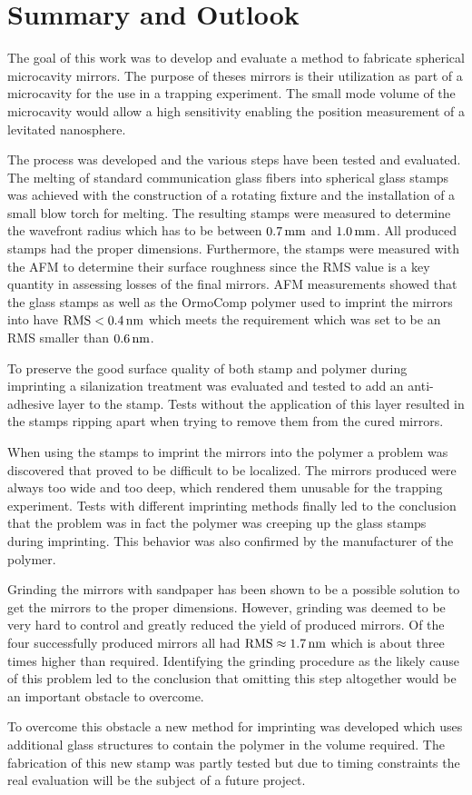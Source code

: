 \chapter{Summary and Outlook}
The goal of this work was to develop and evaluate a method to fabricate spherical microcavity mirrors. The purpose of theses mirrors is their utilization as part of a microcavity for the use in a trapping experiment. The small mode volume of the microcavity would allow a high sensitivity enabling the position measurement of a levitated nanosphere.

The process was developed and the various steps have been tested and evaluated. The melting of standard communication glass fibers into spherical glass stamps was achieved with the construction of a rotating fixture and the installation of a small blow torch for melting. The resulting stamps were measured to determine the wavefront radius which has to be between $0.7\mm$ and $1.0\mm$. All produced stamps had the proper dimensions. Furthermore, the stamps were measured with the AFM to determine their surface roughness since the RMS value is a key quantity in assessing losses of the final mirrors. AFM measurements showed that the glass stamps as well as the OrmoComp polymer used to imprint the mirrors into have $\si{RMS}<0.4\nm$ which meets the requirement which was set to be an RMS smaller than $0.6\nm$.

To preserve the good surface quality of both stamp and polymer during imprinting a silanization treatment was evaluated and tested to add an anti-adhesive layer to the stamp. Tests without the application of this layer resulted in the stamps ripping apart when trying to remove them from the cured mirrors.

When using the stamps to imprint the mirrors into the polymer a problem was discovered that proved to be difficult to be localized. The mirrors produced were always too wide and too deep, which rendered them unusable for the trapping experiment. Tests with different imprinting methods finally led to the conclusion that the problem was in fact the polymer was creeping up the glass stamps during imprinting. This behavior was also confirmed by the manufacturer of the polymer. 

Grinding the mirrors with sandpaper has been shown to be a possible solution to get the mirrors to the proper dimensions. However, grinding was deemed to be very hard to control and greatly reduced the yield of produced mirrors. Of the four successfully produced mirrors all had $\si{RMS}\approx 1.7\nm$ which is about three times higher than required. Identifying the grinding procedure as the likely cause of this problem led to the conclusion that omitting this step altogether would be an important obstacle to overcome.

To overcome this obstacle a new method for imprinting was developed which uses additional glass structures to contain the polymer in the volume required. The fabrication of this new stamp was partly tested but due to timing constraints the real evaluation will be the subject of a future project.
